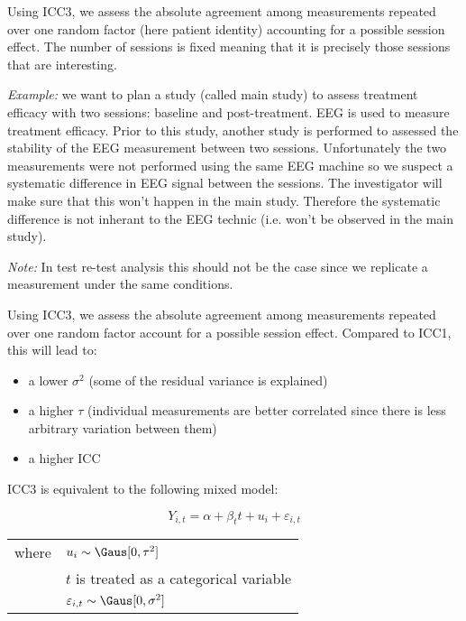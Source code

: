 \documentclass{article}
\begin{document}
Using ICC3, we assess the absolute agreement among measurements
repeated over one random factor (here patient identity) accounting for
a possible session effect. The number of sessions is fixed meaning
that it is precisely those sessions that are interesting.

\bigskip

\emph{Example:} we want to plan a study (called main study) to assess
treatment efficacy with two sessions: baseline and post-treatment. EEG
is used to measure treatment efficacy. Prior to this study, another
study is performed to assessed the stability of the EEG measurement
between two sessions. Unfortunately the two measurements were not
performed using the same EEG machine so we suspect a systematic
difference in EEG signal between the sessions. The investigator will
make sure that this won't happen in the main study. Therefore the
systematic difference is not inherant to the EEG technic (i.e. won't
be observed in the main study).

\bigskip

\emph{Note:}  In test
re-test analysis this should not be the case since we replicate a
measurement under the same conditions.

\bigskip
\bigskip

Using ICC3, we assess the absolute agreement among measurements
repeated over one random factor account for a possible session
effect. Compared to ICC1, this will lead to:
\begin{itemize}
\item a lower \(\sigma^2\) (some of the residual variance is explained)
\item a higher \(\tau\) (individual measurements are better correlated since
there is less arbitrary variation between them)
\item a higher ICC
\end{itemize}

\bigskip

ICC3 is equivalent to the following mixed model:

\begin{equation}
 Y_{i,t} = \alpha + \beta_t t + u_{i} + \varepsilon_{i,t} 
\end{equation}

\begin{tabular}{ll}
where & \(u_{i} \sim \Gaus[0,\tau^2] \)  \\
& \(t\) is treated as a categorical variable \\
& \(\varepsilon_{i,t} \sim \Gaus[0,\sigma^2] \) \\
\end{tabular}
\end{document}
